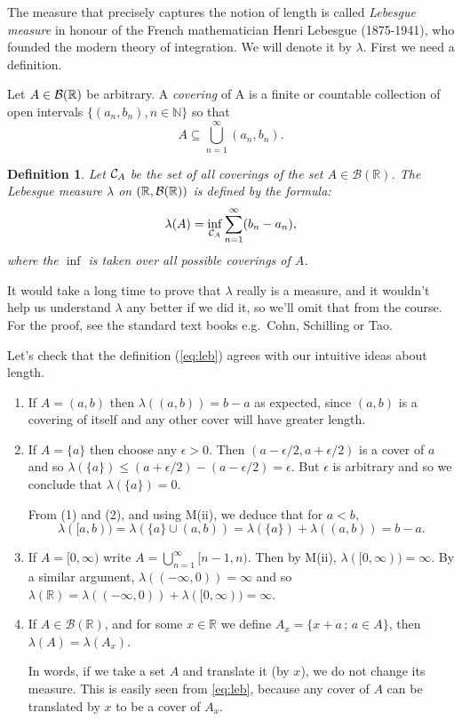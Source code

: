 \documentclass[a4paper]{report}
\newcounter{thm_counter}[chapter]
\newtheorem{defn}[thm_counter]{Definition}
\numberwithin{equation}{chapter}
\numberwithin{thm_counter}{section}
\newcommand{\nN}{n \in \mathbb{N}}
\def\mc{\mathcal} %
\def\mb{\mathbb} %
\def\R{\mb{R}} %
\def\-{\,;\,} %
\begin{document}
The measure that precisely captures the notion of length is called {\it Lebesgue measure} in honour of the French mathematician Henri Lebesgue (1875-1941), who founded the modern theory of integration. We will denote it by $\lambda$. First we need a definition.

Let $A \in {\cal B}(\R)$ be arbitrary. A {\it covering} of A is a finite or countable collection of open intervals $\{(a_{n}, b_{n}), \nN\}$ so that
     $$ A \subseteq \bigcup_{n=1}^{\infty}(a_{n}, b_{n}).$$

\begin{defn}
Let ${\cal C}_{A}$ be the set of all coverings of the set $A\in\mc{B}(\R)$. The Lebesgue measure $\lambda$ on $(\R, {\cal B}(\R))$ is defined by the formula:
\begin{equation} \label{eq:leb}
  \lambda(A) = \inf_{{\cal C}_{A}}\sum_{n=1}^{\infty}(b_{n} - a_{n}),
  \end{equation}
where the $\inf$ is taken over all possible coverings of $A$.
\end{defn}

It would take a long time to prove that $\lambda$ really is a measure, and it wouldn't help us understand $\lambda$ any better if we did it, so we'll omit that from the course. For the proof, see the standard text books e.g.~Cohn, Schilling or Tao.

Let's check that the definition (\ref{eq:leb}) agrees with our intuitive ideas about length.

\begin{enumerate}

\item If $A = (a,b)$ then $\lambda((a,b)) = b-a$ as expected, since $(a,b)$ is a covering of itself and any other cover will have greater length.

\item If $A = \{a\}$ then choose any $\epsilon > 0$. Then  $(a - \epsilon/2, a + \epsilon/2)$ is a cover of $a$ and so $\lambda(\{a\}) \leq (a + \epsilon/2) - (a - \epsilon/2) = \epsilon$. But $\epsilon$ is arbitrary and so we conclude that $\lambda(\{a\}) = 0$.

 

From (1) and (2), and using M(ii), we deduce that for $a < b,$ $$\lambda([a, b)) = \lambda(\{a\} \cup (a, b)) = \lambda(\{a\}) + \lambda((a, b)) = b-a.$$

\item If $A = [0, \infty)$  write $A = \bigcup_{n=1}^{\infty}[n-1, n)$. Then by M(ii), $\lambda([0, \infty)) = \infty$. By a similar argument, $\lambda((-\infty, 0)) = \infty$ and so $\lambda(\R) =  \lambda((-\infty, 0)) + \lambda([0, \infty)) = \infty$.

\item If $A\in\mc{B}(\R)$, and for some $x\in\R$ we define $A_x=\{x+a\-a\in A\}$, then $\lambda(A)=\lambda(A_x)$.

In words, if we take a set $A$ and translate it (by $x$), we do not change its measure. This is easily seen from \eqref{eq:leb}, because any cover of $A$ can be translated by $x$ to be a cover of $A_x$.
\end{enumerate}
\end{document}
